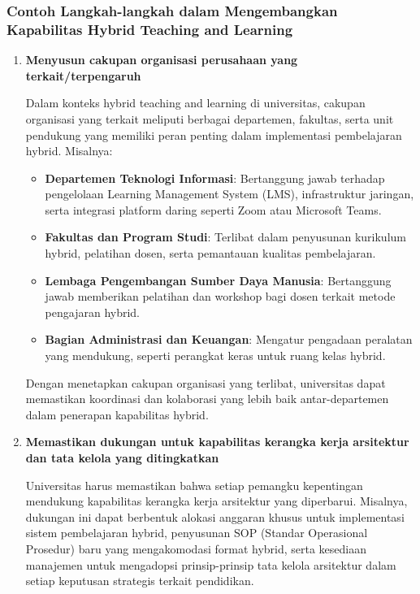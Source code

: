 \subsubsection{Contoh Langkah-langkah dalam Mengembangkan Kapabilitas Hybrid Teaching and Learning}

\begin{enumerate}
	\item \textbf{Menyusun cakupan organisasi perusahaan yang terkait/terpengaruh}
	
	Dalam konteks hybrid teaching and learning di universitas, cakupan organisasi yang terkait meliputi berbagai departemen, fakultas, serta unit pendukung yang memiliki peran penting dalam implementasi pembelajaran hybrid. Misalnya:
	\begin{itemize}
		\item \textbf{Departemen Teknologi Informasi}: Bertanggung jawab terhadap pengelolaan Learning Management System (LMS), infrastruktur jaringan, serta integrasi platform daring seperti Zoom atau Microsoft Teams.
		\item \textbf{Fakultas dan Program Studi}: Terlibat dalam penyusunan kurikulum hybrid, pelatihan dosen, serta pemantauan kualitas pembelajaran.
		\item \textbf{Lembaga Pengembangan Sumber Daya Manusia}: Bertanggung jawab memberikan pelatihan dan workshop bagi dosen terkait metode pengajaran hybrid.
		\item \textbf{Bagian Administrasi dan Keuangan}: Mengatur pengadaan peralatan yang mendukung, seperti perangkat keras untuk ruang kelas hybrid.
	\end{itemize}
	
	Dengan menetapkan cakupan organisasi yang terlibat, universitas dapat memastikan koordinasi dan kolaborasi yang lebih baik antar-departemen dalam penerapan kapabilitas hybrid.
	
	\item \textbf{Memastikan dukungan untuk kapabilitas kerangka kerja arsitektur dan tata kelola yang ditingkatkan}
	
	Universitas harus memastikan bahwa setiap pemangku kepentingan mendukung kapabilitas kerangka kerja arsitektur yang diperbarui. Misalnya, dukungan ini dapat berbentuk alokasi anggaran khusus untuk implementasi sistem pembelajaran hybrid, penyusunan SOP (Standar Operasional Prosedur) baru yang mengakomodasi format hybrid, serta kesediaan manajemen untuk mengadopsi prinsip-prinsip tata kelola arsitektur dalam setiap keputusan strategis terkait pendidikan.
	

\end{enumerate}
